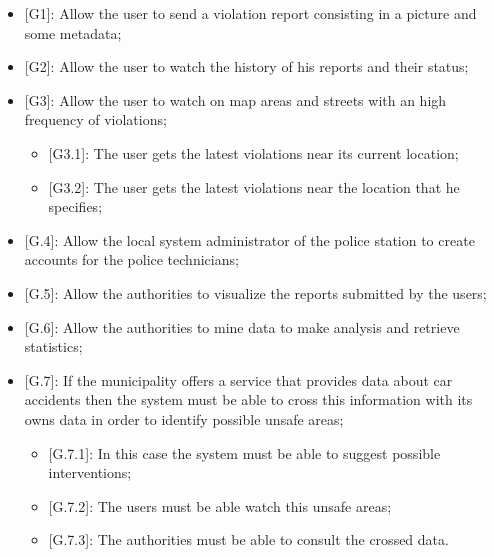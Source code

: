\begin{itemize}  
  \item {[G1]}: Allow the user to send a violation report consisting in a picture and some metadata;
  \item {[G2]}: Allow the user to watch the history of his reports and their status;
  \item {[G3]}: Allow the user to watch on map areas and streets with an high frequency of violations;
  \begin{itemize}
    \item {[G3.1]}: The user gets the latest violations near its current location;
    \item {[G3.2]}: The user gets the latest violations near the location that he specifies;
  \end{itemize} 
  \item {[G.4]}: Allow the local system administrator of the police station to create accounts for the police technicians;
  \item {[G.5]}: Allow the authorities to visualize the reports submitted by the users;
  \item {[G.6]}: Allow the authorities to mine data to make analysis and retrieve statistics;
  \item {[G.7]}: If the municipality offers a service that provides data about car accidents then the system must be able to cross this information with its owns data in order to identify possible unsafe areas;
  \begin{itemize}
    \item {[G.7.1]}: In this case the system must be able to suggest possible interventions;
    \item {[G.7.2]}: The users must be able watch this unsafe areas;
    \item {[G.7.3]}: The authorities must be able to consult the crossed data.
  \end{itemize} 
\end{itemize}
